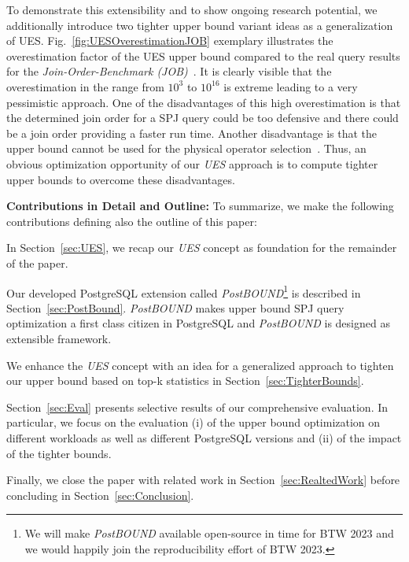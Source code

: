 To demonstrate this extensibility and to show ongoing research potential, we additionally introduce two tighter upper bound variant ideas as a generalization of UES. 
Fig.~\ref{fig:UESOverestimationJOB} exemplary illustrates the overestimation factor of the UES upper bound compared to the real query results for the \emph{Join-Order-Benchmark (JOB)}~\cite{DBLP:journals/pvldb/LeisGMBK015}.
It is clearly visible that the overestimation in the range from $10^3$ to $10^{16}$ is extreme leading to a very pessimistic approach. 
One of the disadvantages of this high overestimation is that the determined join order for a SPJ query could be too defensive and there could be a join order providing a faster run time. 
Another disadvantage is that the upper bound cannot be used for the physical operator selection~\cite{hertzschuch-21-ues,DBLP:journals/pvldb/HertzschuchHHL22}. 
Thus, an obvious optimization opportunity of our \emph{UES} approach is to compute tighter upper bounds to overcome these disadvantages.
 
\textbf{Contributions in Detail and Outline:} To summarize, we make the following contributions defining also the outline of this paper:
\begin{compactitem}
\item In Section~\ref{sec:UES}, we recap our \emph{UES} concept as foundation for the remainder of the paper.
\item Our developed PostgreSQL extension called \emph{PostBOUND}\footnote{We will make \emph{PostBOUND} available open-source in
time for BTW 2023 and we would happily join the reproducibility effort of BTW 2023.} is described in Section~\ref{sec:PostBound}. \emph{PostBOUND} makes upper bound SPJ query optimization a first class citizen in PostgreSQL and \emph{PostBOUND} is designed as extensible framework.%
\item We enhance the \emph{UES} concept with an idea for a generalized approach to tighten our upper bound based on top-k statistics in Section~\ref{sec:TighterBounds}. 
\item Section~\ref{sec:Eval} presents selective results of our comprehensive evaluation. In particular, we focus on the evaluation (i) of the upper bound optimization on different workloads as well as different PostgreSQL versions and (ii) of the impact of the tighter bounds.  
\end{compactitem}
Finally, we close the paper with related work in Section~\ref{sec:RealtedWork} before concluding in Section~\ref{sec:Conclusion}. 


